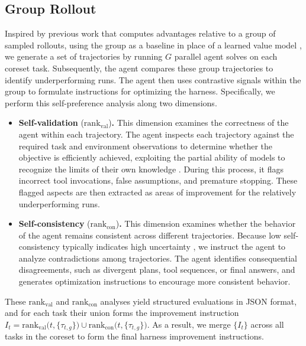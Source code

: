 \subsection{Group Rollout}

Inspired by previous work that computes advantages relative to a group of sampled rollouts, using the group as a baseline in place of a learned value model \citep{shao2024deepseekmath}, we generate a set of trajectories by running $G$ parallel agent solves on each coreset task.
Subsequently, the agent compares these group trajectories to identify underperforming runs.
The agent then uses contrastive signals within the group to formulate instructions for optimizing the harness.
Specifically, we perform this self-preference analysis along two dimensions.
\begin{itemize}
    \item {} \textbf{Self-validation} ($\mathrm{rank}_{\mathrm{val}}$)\textbf{.} This dimension examines the correctness of the agent within each trajectory.
    The agent inspects each trajectory against the required task and environment observations to determine whether the objective is efficiently achieved, exploiting the partial ability of models to recognize the limits of their own knowledge \citep{pan2025refusal}.
    During this process, it flags incorrect tool invocations, false assumptions, and premature stopping. These flagged aspects are then extracted as areas of improvement for the relatively underperforming runs.
    \item {} \textbf{Self-consistency} ($\mathrm{rank}_{\mathrm{con}}$)\textbf{.} This dimension examines whether the behavior of the agent remains consistent across different trajectories.
    Because low self-consistency typically indicates high uncertainty \citep{wang2022selfconsistency,farquhar2024semantic}, we instruct the agent to analyze contradictions among trajectories.
    The agent identifies consequential disagreements, such as divergent plans, tool sequences, or final answers, and generates optimization instructions to encourage more consistent behavior.
\end{itemize}
These $\mathrm{rank}_{\mathrm{val}}$ and $\mathrm{rank}_{\mathrm{con}}$ analyses yield structured evaluations in JSON format, and for each task their union forms the improvement instruction $I_t = \mathrm{rank}_{\mathrm{val}}\bigl(t, \{\tau_{t,g}\}\bigr) \cup \mathrm{rank}_{\mathrm{con}}\bigl(t, \{\tau_{t,g}\}\bigr)$.
As a result, we merge $\{I_t\}$ across all tasks in the coreset to form the final harness improvement instructions.

